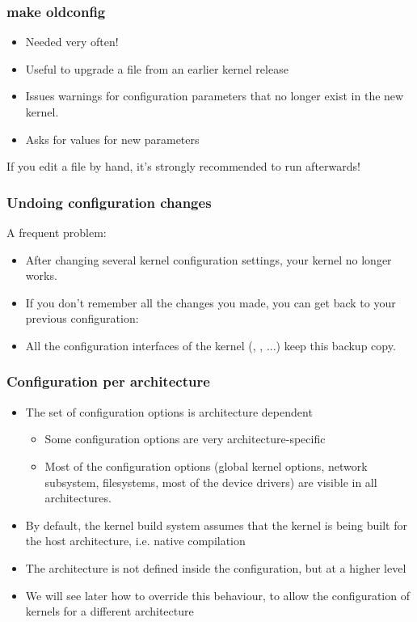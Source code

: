 \begin{frame}
  \frametitle{make oldconfig}
  \begin{itemize}
  \item Needed very often!
  \item Useful to upgrade a  file from an earlier kernel release
  \item Issues warnings for configuration parameters that no longer
    exist in the new kernel.
  \item Asks for values for new parameters
  \end{itemize}
  If you edit a  file by hand, it's strongly recommended
  to run  afterwards!
\end{frame}

\begin{frame}
  \frametitle{Undoing configuration changes}
  A frequent problem:
  \begin{itemize}
  \item After changing several kernel configuration settings, your
    kernel no longer works.
  \item If you don't remember all the changes you made,
    you can get back to your previous configuration:\\
  \item All the configuration interfaces of the kernel
    (, , ...) keep
    this  backup copy.
  \end{itemize}
\end{frame}

\begin{frame}
  \frametitle{Configuration per architecture}
  \begin{itemize}
  \item The set of configuration options is architecture dependent
    \begin{itemize}
    \item Some configuration options are very architecture-specific
    \item Most of the configuration options (global kernel options,
      network subsystem, filesystems, most of the device drivers) are
      visible in all architectures.
    \end{itemize}
  \item By default, the kernel build system assumes that the kernel is
    being built for the host architecture, i.e. native compilation
  \item The architecture is not defined inside the configuration, but
    at a higher level
  \item We will see later how to override this behaviour, to allow the
    configuration of kernels for a different architecture
  \end{itemize}
\end{frame}
